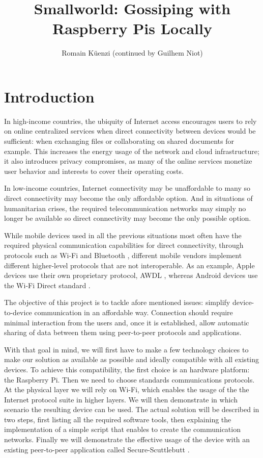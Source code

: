 \documentclass[a4paper,11pt,oneside]{report}
\title{Smallworld: Gossiping with Raspberry Pis Locally}
\author{Romain Küenzi (continued by Guilhem Niot)}
\begin{document}
\maketitle

\maketoc

\chapter{Introduction}

In high-income countries, the ubiquity of Internet access encourages users to rely on online centralized services when direct connectivity between devices would be sufficient: when exchanging files or collaborating on shared documents for example. This increases the energy usage of the network and cloud infrastructure; it also introduces privacy compromises, as many of the online services monetize user behavior and interests to cover their operating costs.

In low-income countries, Internet connectivity may be unaffordable to many so direct connectivity may become the only affordable option. And in situations of humanitarian crises, the required telecommunication networks may simply no longer be available so direct connectivity may become the only possible option.

While mobile devices used in all the previous situations most often have the required physical communication capabilities for direct connectivity, through protocols such as Wi-Fi \cite{wifi2016} and Bluetooth \cite{bluetooth}, different mobile vendors implement different higher-level protocols that are not interoperable. As an example, Apple devices use their own proprietary protocol, AWDL \cite{appleAWDL}, whereas Android devices use the Wi-Fi Direct standard \cite{wifiDirect}.

The objective of this project is to tackle afore mentioned issues: simplify device-to-device communication in an affordable way. Connection should require minimal interaction from the users and, once it is established, allow automatic sharing of data between them using peer-to-peer protocols and applications.

With that goal in mind, we will first have to make a few technology choices to make our solution as available as possible and ideally compatible with all existing devices. To achieve this compatibility, the first choice is an hardware platform: the Raspberry Pi. Then we need to choose standards communications protocols. At the physical layer we will rely on Wi-Fi, which enables the usage of the the Internet protocol suite in higher layers. We will then demonstrate in which scenario the resulting device can be used. The actual solution will be described in two steps, first listing all the required software tools, then explaining the implementation of a simple script that enables to create the communication networks. Finally we will demonstrate the effective usage of the device with an existing peer-to-peer application called Secure-Scuttlebutt \cite{tarr2019secure}.
\end{document}
